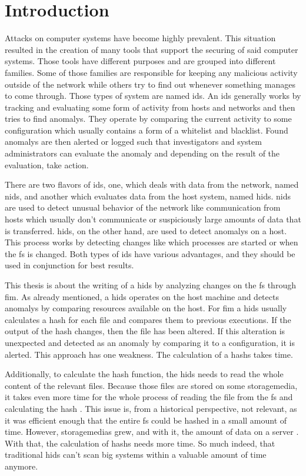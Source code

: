 \chapter{Introduction}

Attacks on computer systems have become highly prevalent. This situation resulted in the creation of many tools that support the securing of said computer systems. Those tools have different purposes and are grouped into different families. Some of those families are responsible for keeping any malicious activity outside of the network while others try to find out whenever something manages to come through. Those types of system are named \gls{ids}. An \gls{ids} generally works by tracking and evaluating some form of activity from hosts and networks and then tries to find \glspl{anomaly}. They operate by comparing the current activity to some configuration which usually contains a form of a whitelist and blacklist. Found \glspl{anomaly} are then alerted or logged such that investigators and system administrators can evaluate the \gls{anomaly} and depending on the result of the evaluation, take action. \cite{hidsnids}

There are two flavors of \gls{ids}, one, which deals with data from the network, named \gls{nids}, and another which evaluates data from the host system, named \gls{hids}. \gls{nids} are used to detect unusual behavior of the network like communication from hosts which usually don't communicate or suspiciously large amounts of data that is transferred. \gls{hids}, on the other hand, are used to detect \glspl{anomaly} on a host. This process works by detecting changes like which processes are started or when the \gls{fs} is changed. Both types of \gls{ids} have various advantages, and they should be used in conjunction for best results. \cite{hidsnids}

This thesis is about the writing of a \gls{hids} by analyzing changes on the \gls{fs} through \gls{fim}. As already mentioned, a \gls{hids} operates on the host machine and detects \glspl{anomaly} by comparing resources available on the host. For \gls{fim} a \gls{hids} usually calculates a \gls{hash} for each file and compares them to previous executions. If the output of the \gls{hash} changes, then the file has been altered. If this alteration is unexpected and detected as an \gls{anomaly} by comparing it to a configuration, it is alerted. This approach has one weakness. The calculation of a \glspl{hash} takes time.

Additionally, to calculate the hash function, the \gls{hids} needs to read the whole content of the relevant files. Because those files are stored on some \gls{storagemedia}, it takes even more time for the whole process of reading the file from the \gls{fs} and calculating the hash \cite{hash:slow, hash:speed}. This issue is, from a historical perspective, not relevant, as it was efficient enough that the entire \gls{fs} could be hashed in a small amount of time. However, \glspl{storagemedia} grew, and with it, the amount of data on a server \cite{bruce:imaging}. With that, the calculation of \glspl{hash} needs more time. So much indeed, that traditional \gls{hids} can't scan big systems within a valuable amount of time anymore.

